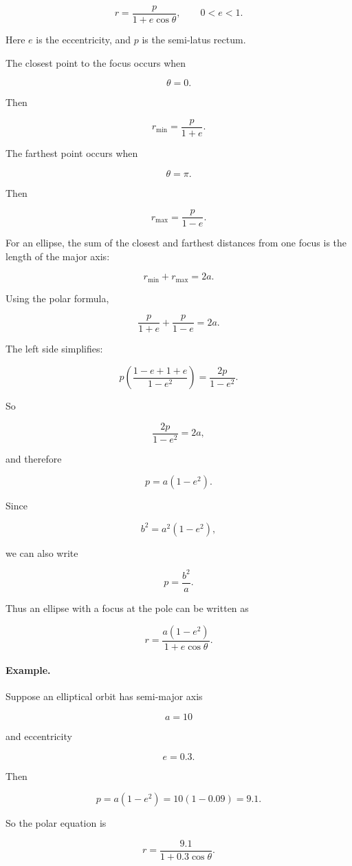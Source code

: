 \[
\boxed{
r=\frac{p}{1+e\cos\theta},
\qquad 0<e<1.
}
\]

Here \(e\) is the eccentricity, and \(p\) is the semi-latus rectum.

The closest point to the focus occurs when

\[
\theta=0.
\]

Then

\[
r_{\min}=\frac{p}{1+e}.
\]

The farthest point occurs when

\[
\theta=\pi.
\]

Then

\[
r_{\max}=\frac{p}{1-e}.
\]

For an ellipse, the sum of the closest and farthest distances from one focus is the length
of the major axis:

\[
r_{\min}+r_{\max}=2a.
\]

Using the polar formula,

\[
\frac{p}{1+e}+\frac{p}{1-e}=2a.
\]

The left side simplifies:

\[
p\left(\frac{1-e+1+e}{1-e^2}\right)
=
\frac{2p}{1-e^2}.
\]

So

\[
\frac{2p}{1-e^2}=2a,
\]

and therefore

\[
\boxed{
p=a(1-e^2).
}
\]

Since

\[
b^2=a^2(1-e^2),
\]

we can also write

\[
\boxed{
p=\frac{b^2}{a}.
}
\]

Thus an ellipse with a focus at the pole can be written as

\[
\boxed{
r=\frac{a(1-e^2)}{1+e\cos\theta}.
}
\]

\paragraph{Example.}
Suppose an elliptical orbit has semi-major axis

\[
a=10
\]

and eccentricity

\[
e=0.3.
\]

Then

\[
p=a(1-e^2)=10(1-0.09)=9.1.
\]

So the polar equation is

\[
\boxed{
r=\frac{9.1}{1+0.3\cos\theta}.
}
\]

